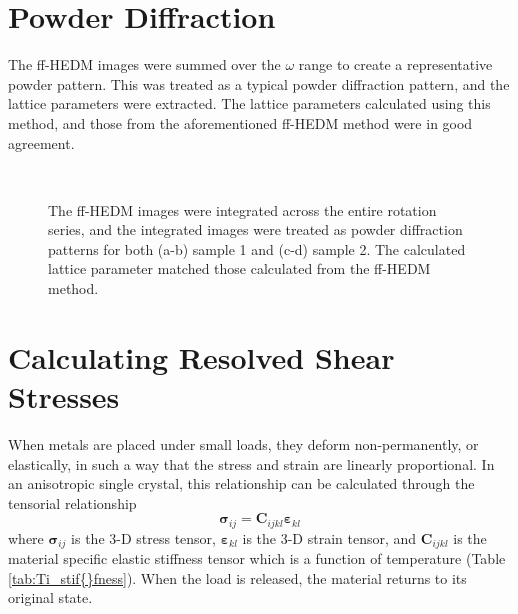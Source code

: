 \documentclass[3p]{elsarticle}
\begin{document}
\begin{appendices}
\appendix


\section{Powder Dif{}fraction}\label{app:powder}

The f{}f-HEDM images were summed over the $\omega$ range to create a representative powder pattern. This was treated as a typical powder dif{}fraction pattern, and the lattice parameters were extracted. The lattice parameters calculated using this method, and those from the aforementioned f{}f-HEDM method were in good agreement.



\begin{figure}[h]
	\centering
	\hspace{5pt}
	 \\
	\hspace{5pt}
	\caption{The f{}f-HEDM images were integrated across the entire rotation series, and the integrated images were treated as powder dif{}fraction patterns for both (a-b) sample 1 and (c-d) sample 2. The calculated lattice parameter matched those calculated from the f{}f-HEDM method.}
	\label{fig:powder}
\end{figure}

\newpage
\section{Calculating Resolved Shear Stresses}
\label{app:CRSS}
	When metals are placed under small loads, they deform non-permanently, or elastically, in such a way that the stress and strain are linearly proportional. In an anisotropic single crystal, this relationship can be calculated through the tensorial relationship
		\begin{equation}
		\boldsymbol{\sigma}_{ij} = \mathbf{C}_{ijkl} \boldsymbol{\bm{\varepsilon}}_{kl}
		\end{equation}
	where $\boldsymbol{\sigma}_{ij}$ is the 3-D stress tensor, $\boldsymbol{\bm{\varepsilon}}_{kl}$ is the 3-D strain tensor, and $\mathbf{C}_{ijkl}$ is the material specific elastic stif{}fness tensor which is a function of temperature (Table \ref{tab:Ti_stif{}fness}). When the load is released, the material returns to its original state.


\end{appendices}
\end{document}
